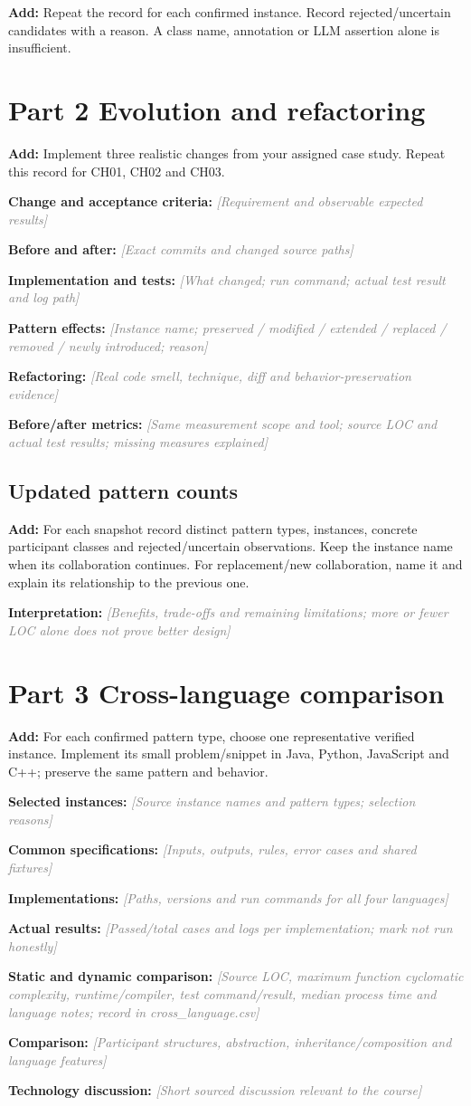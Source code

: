 \documentclass[11pt,a4paper]{article}
\newcommand{\entry}[2]{\textbf{#1:} \textcolor{gray}{\textit{[#2]}}\par}
\newcommand{\help}[1]{\textbf{Add:} #1\par}
\begin{document}
\help{Repeat the record for each confirmed instance. Record rejected/uncertain candidates with a reason. A class name, annotation or LLM assertion alone is insufficient.}
\section{Part 2 Evolution and refactoring}
\help{Implement three realistic changes from your assigned case study. Repeat this record for CH01, CH02 and CH03.}
\entry{Change and acceptance criteria}{Requirement and observable expected results}
\entry{Before and after}{Exact commits and changed source paths}
\entry{Implementation and tests}{What changed; run command; actual test result and log path}
\entry{Pattern effects}{Instance name; preserved / modified / extended / replaced / removed / newly introduced; reason}
\entry{Refactoring}{Real code smell, technique, diff and behavior-preservation evidence}
\entry{Before/after metrics}{Same measurement scope and tool; source LOC and actual test results; missing measures explained}
\subsection{Updated pattern counts}
\help{For each snapshot record distinct pattern types, instances, concrete participant classes and rejected/uncertain observations. Keep the instance name when its collaboration continues. For replacement/new collaboration, name it and explain its relationship to the previous one.}
\entry{Interpretation}{Benefits, trade-offs and remaining limitations; more or fewer LOC alone does not prove better design}
\section{Part 3 Cross-language comparison}
\help{For each confirmed pattern type, choose one representative verified instance. Implement its small problem/snippet in Java, Python, JavaScript and C++; preserve the same pattern and behavior.}
\entry{Selected instances}{Source instance names and pattern types; selection reasons}
\entry{Common specifications}{Inputs, outputs, rules, error cases and shared fixtures}
\entry{Implementations}{Paths, versions and run commands for all four languages}
\entry{Actual results}{Passed/total cases and logs per implementation; mark not run honestly}
\entry{Static and dynamic comparison}{Source LOC, maximum function cyclomatic complexity, runtime/compiler, test command/result, median process time and language notes; record in cross\_language.csv}
\entry{Comparison}{Participant structures, abstraction, inheritance/composition and language features}
\entry{Technology discussion}{Short sourced discussion relevant to the course}
\end{document}
